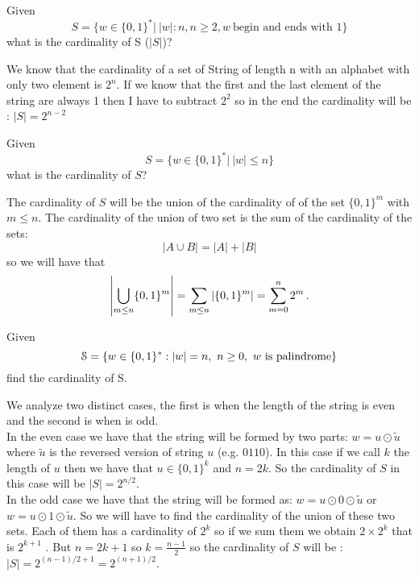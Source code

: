 \begin{ex}
	Given
	\[S = \{w \in \{0,1\}^* |\  |w| : n, n \geq 2, w\ \text{begin and ends with 1} \}\]
	what is the cardinality of S (\(|S|\))?
\end{ex}
\begin{solution}
	We know that the cardinality of a set of String of length n with an alphabet with only two element is  \(2^n\). If we know that the first and the last element of the string are always 1 then I have to subtract \(2^2\) so in the end the cardinality will be : \(|S| = 2^{n-2}\)
\end{solution}
\begin{ex}
	Given
	\[S = \{w \in \{0,1\}^* |\   |w| \leq n\}\]what is the cardinality of $S$?
\end{ex}
\begin{solution}
	The cardinality of $S$ will be the union of the cardinality of of the set \(\{0,1\}^m\) with \(m \leq n\). The cardinality of the union of two set is the sum of the cardinality of the sets:
	\[
		\left\lvert A \cup B \right \rvert = |A| + |B|
	\]
	so we will have that
	\[
		\left \lvert \bigcup_{m\leq n} \{0,1\}^m \right \rvert = \sum_{m \leq n} \left \lvert \{0,1\}^m \right \rvert = \sum_{m=0}^n 2^m \, .
	\]
\end{solution}
\begin{ex}
	Given
	\[
		\mathcal{S} = \{w \in \{ 0,1 \}^*  :   |w| = n, \ n \geq  0, \ w \text{ is palindrome} \}
	\]
	find the cardinality of S.
\end{ex}
\begin{solution}
	We analyze two distinct cases, the first is when the length of the string is even and the second is when is odd.\\
	In the even case we have that the string will be formed by two parts: $w = u \odot \tilde{u}$ where $\tilde{u}$ is the reversed version of string $u$ (e.g. $0110$).
	In this case if we call $k$ the length of $u$ then we have that \(u \in \{0,1\}^k\) and $n= 2k$.
	So the cardinality of $S$ in this case will be \(|S| = 2^{n/2}\). \\
	In the odd case we have that the string will be formed as: $w = u \odot 0 \odot \tilde{u}$ or $w=u \odot 1 \odot \tilde{u}$.
	So we will have to find the cardinality of the union of these two sets. Each of them has a cardinality of \(2^k\) so if we sum them we obtain \(2 \times 2^k\) that is \(2^{k+1}\) . But $n=2k+1$ so \(k= \frac{n-1}{2}\) so the cardinality of $S$ will be : \(|S| = 2^{(n-1)/2 +1} = 2^{(n+1)/2}\).
\end{solution}

